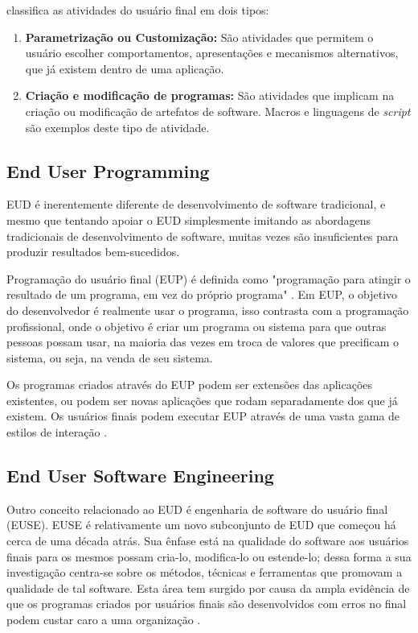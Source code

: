  classifica as atividades do usuário final em dois tipos:

\begin{enumerate}
\item \textbf{Parametrização ou Customização:} São atividades que permitem o usuário escolher comportamentos, apresentações e mecanismos  alternativos, que já existem dentro de uma aplicação.

\item \textbf{Criação e modificação de programas:} São atividades que implicam na criação ou modificação de artefatos de software. Macros e linguagens de \textit{script} são exemplos deste tipo de atividade.
\end{enumerate}

\subsection{End User Programming}

EUD é inerentemente diferente de desenvolvimento de software tradicional, e mesmo que tentando apoiar o EUD simplesmente imitando as abordagens tradicionais de desenvolvimento de software, muitas vezes são insuficientes para produzir resultados bem-sucedidos.

Programação do usuário final (EUP) é definida como "programação para atingir o resultado de um programa, em vez do próprio programa" \cite{ko2011state}. Em EUP, o objetivo do desenvolvedor é realmente usar o programa, isso contrasta com a programação profissional, onde o objetivo é criar um programa ou sistema para que outras pessoas possam usar, na maioria das vezes em troca de valores que precificam o sistema, ou seja, na venda de seu sistema.

Os programas criados através do EUP podem ser extensões das aplicações existentes, ou podem ser novas aplicações que rodam separadamente dos que já existem. Os usuários finais podem executar EUP através de uma vasta gama de estilos de interação \cite{nardi1993small}.

\subsection{End User Software Engineering}

Outro conceito relacionado ao EUD é engenharia de software do usuário final (EUSE). EUSE é relativamente um novo subconjunto de EUD que começou há cerca de uma década atrás. Sua ênfase está na qualidade do software aos usuários finais para os mesmos possam cria-lo, modifica-lo ou estende-lo; dessa forma a sua investigação centra-se sobre os métodos, técnicas e ferramentas que promovam a qualidade de tal software. Esta área tem surgido por causa da ampla evidência de que os programas criados por usuários finais são desenvolvidos com erros no final podem custar caro a uma organização \cite{panko1998we,burnett2010technology,ko2011state}.

